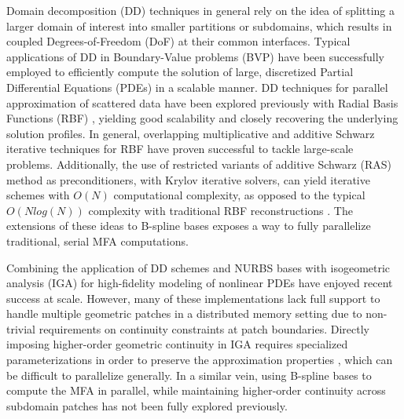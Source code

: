 \label{sec:related-work}

Domain decomposition (DD) techniques in general rely on the idea of splitting a larger domain of interest into smaller partitions or subdomains, which results in coupled Degrees-of-Freedom (DoF) at their common interfaces. Typical applications of DD in Boundary-Value problems (BVP) \cite{smith-ddm, lions-asm} have been successfully employed to efficiently compute the solution of large, discretized Partial Differential Equations (PDEs) in a scalable manner. 
DD techniques for parallel approximation of scattered data have been explored previously with Radial Basis Functions (RBF) \cite{mai-approx-rbf}, yielding good scalability and closely recovering the underlying solution profiles. In general, overlapping multiplicative and additive Schwarz \cite{orasm-as-ms-2007} iterative techniques for RBF \cite{ddm-rbf} have proven successful to tackle large-scale problems. Additionally, the use of restricted variants of additive Schwarz (RAS) method as preconditioners, with Krylov iterative solvers, can yield iterative schemes \cite{yokota-rasm-rbf} with $O(N)$ computational complexity, as opposed to the typical $O(N log(N))$ complexity with traditional RBF reconstructions \cite{ddm-rbf-fast}. The extensions of these ideas to B-spline bases exposes a way to fully parallelize traditional, serial MFA computations.

Combining the application of DD schemes and NURBS bases with isogeometric analysis (IGA) \cite{cottrell2009, da2012} for high-fidelity modeling of nonlinear PDEs \cite{dede2015, marini2015parallel, petiga-dalcin-2016} have enjoyed recent success at scale. However, many of these implementations lack full support to handle multiple geometric patches in a distributed memory setting due to non-trivial requirements on continuity constraints at patch boundaries. 
Directly imposing higher-order geometric continuity in IGA requires specialized parameterizations in order to preserve the approximation properties \cite{kapl2018construction}, which can be difficult to parallelize \cite{hofer2018fast} generally. 
%
In a similar vein, using B-spline bases to compute the MFA in parallel, while maintaining higher-order continuity across subdomain patches has not been fully explored previously. 

